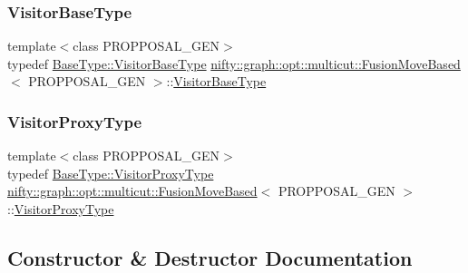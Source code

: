 \subsubsection{\texorpdfstring{Visitor\+Base\+Type}{VisitorBaseType}}
{\footnotesize\ttfamily template$<$class P\+R\+O\+P\+P\+O\+S\+A\+L\+\_\+\+G\+EN$>$ \\
typedef \hyperlink{classnifty_1_1graph_1_1opt_1_1common_1_1SolverBase_ad9932afb08dd17d375de4b15da9ffaa6}{Base\+Type\+::\+Visitor\+Base\+Type} \hyperlink{classnifty_1_1graph_1_1opt_1_1multicut_1_1FusionMoveBased}{nifty\+::graph\+::opt\+::multicut\+::\+Fusion\+Move\+Based}$<$ P\+R\+O\+P\+P\+O\+S\+A\+L\+\_\+\+G\+EN $>$\+::\hyperlink{classnifty_1_1graph_1_1opt_1_1common_1_1SolverBase_ad9932afb08dd17d375de4b15da9ffaa6}{Visitor\+Base\+Type}}

\mbox{\label{classnifty_1_1graph_1_1opt_1_1multicut_1_1FusionMoveBased_a55c92ac6a0a3bf6e6e3111b5e4aa5e1a}} 
\subsubsection{\texorpdfstring{Visitor\+Proxy\+Type}{VisitorProxyType}}
{\footnotesize\ttfamily template$<$class P\+R\+O\+P\+P\+O\+S\+A\+L\+\_\+\+G\+EN$>$ \\
typedef \hyperlink{classnifty_1_1graph_1_1opt_1_1common_1_1SolverBase_ad209b469b3bc9fc0fc14e9fed4d09075}{Base\+Type\+::\+Visitor\+Proxy\+Type} \hyperlink{classnifty_1_1graph_1_1opt_1_1multicut_1_1FusionMoveBased}{nifty\+::graph\+::opt\+::multicut\+::\+Fusion\+Move\+Based}$<$ P\+R\+O\+P\+P\+O\+S\+A\+L\+\_\+\+G\+EN $>$\+::\hyperlink{classnifty_1_1graph_1_1opt_1_1common_1_1SolverBase_ad209b469b3bc9fc0fc14e9fed4d09075}{Visitor\+Proxy\+Type}}



\subsection{Constructor \& Destructor Documentation}
\mbox{\label{classnifty_1_1graph_1_1opt_1_1multicut_1_1FusionMoveBased_af6ced8e66854c10174e5d326b0bfa09f}} 

